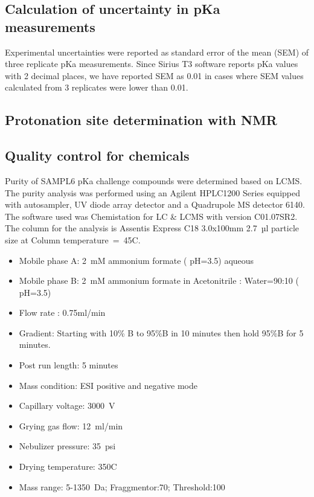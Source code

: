 \documentclass[9pt,lineno]{elife}
\begin{document}
\subsection{Calculation of uncertainty in pKa measurements}
Experimental uncertainties were reported as standard error of the mean (SEM) of three replicate pKa measurements. Since Sirius T3 software reports pKa values with 2 decimal places, we have reported SEM as 0.01 in cases where SEM values calculated from 3 replicates were lower than 0.01.


\subsection{Protonation site determination with NMR}

\subsection{Quality control for chemicals}
Purity of SAMPL6 pKa challenge compounds were determined based on LC\textendash MS. The purity analysis was performed using an Agilent HPLC1200 Series equipped with auto\textendash  sampler, UV diode array detector and a Quadrupole MS detector 6140. The software used was Chemistation for LC \& LC\/MS with version C01.07SR2.
The column for the analysis is Assentis Express C18 3.0x100mm 2.7~µl particle size at Column temperature~=~45\textdegree C.
\begin{itemize}

\item Mobile phase A: 2~mM ammonium formate ( pH=3.5) aqueous
\item Mobile phase B: 2~mM ammonium formate in Acetonitrile : Water=90:10 ( pH=3.5)
\item Flow rate : 0.75ml/min
\item Gradient: Starting with 10\% B to 95\%B in 10 minutes then hold 95\%B for 5 minutes. 
\item Post run length: 5 minutes 
\item Mass condition: ESI positive and negative mode
\item Capillary voltage: 3000~V
\item Grying gas flow: 12~ml/min
\item Nebulizer pressure: 35~psi
\item Drying temperature: 350\textdegree C
\item Mass range: 5-1350~Da; Fraggmentor:70; Threshold:100
\end{itemize}
\end{document}
